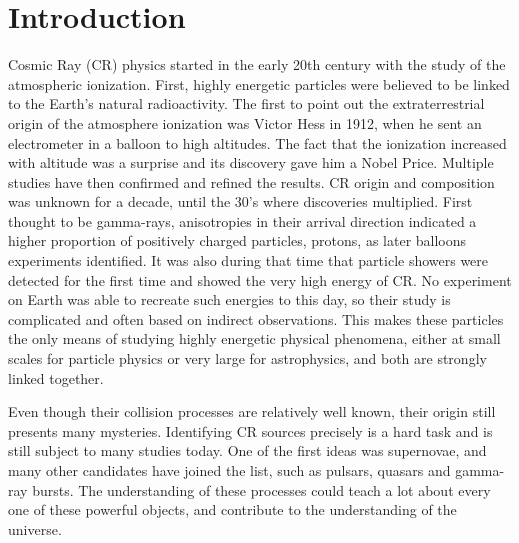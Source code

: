 \chapter*{Introduction}
\label{ch:introduction}

%
%
%
%	

Cosmic Ray (CR) physics started in the early 20th century with the study of the atmospheric ionization. First, highly energetic particles were believed to be linked to the Earth's natural radioactivity. The first to point out the extraterrestrial origin of the atmosphere ionization was Victor Hess in 1912, when he sent an electrometer in a balloon to high altitudes. The fact that the ionization increased with altitude was a surprise and its discovery gave him a Nobel Price. Multiple studies have then confirmed and refined the results. CR origin and composition was unknown for a decade, until the 30's where discoveries multiplied. First thought to be gamma-rays, anisotropies in their arrival direction indicated a higher proportion of positively charged particles, protons, as later balloons experiments identified. It was also during that time that particle showers were detected for the first time and showed the very high energy of CR. No experiment on Earth was able to recreate such energies to this day, so their study is complicated and often based on indirect observations. This makes these particles the only means of studying highly energetic physical phenomena, either at small scales for particle physics or very large for astrophysics, and both are strongly linked together. 

Even though their collision processes are relatively well known, their origin still presents many mysteries. Identifying CR sources precisely is a hard task and is still subject to many studies today. One of the first ideas was supernovae, and many other candidates have joined the list, such as pulsars, quasars and gamma-ray bursts. The understanding of these processes could teach a lot about every one of these powerful objects, and contribute to the understanding of the universe.

